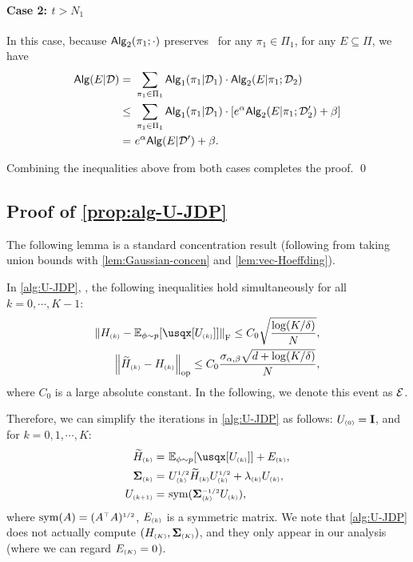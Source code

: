 \paragraph{Case 2: $t>N_1$}
In this case, because $\mathsf{Alg}_2(\pi_1;\cdot)$ preserves \aJDP~for any $\pi_1\in\Pi_1$, for any $E\subseteq \Pi$, we have
\begin{align*}
    \mathsf{Alg}(E|\mathcal{D})=&~\sum_{\pi_1\in\Pi_1} \mathsf{Alg}_1(\pi_1|\mathcal{D}_1) \cdot \mathsf{Alg}_2(E|\pi_1;\mathcal{D}_2) \\
    \leq&~\sum_{\pi_1\in\Pi_1} \mathsf{Alg}_1(\pi_1|\mathcal{D}_1) \cdot {\left[  e^{\alpha}\mathsf{Alg}_2(E|\pi_1;\mathcal{D}_2')+\beta  \right]}\\
    =&~ e^{\alpha} \mathsf{Alg}(E|\mathcal{D}')+\beta.
\end{align*}

Combining the inequalities above from both cases completes the proof.
\qed




\subsection{Proof of \cref{prop:alg-U-JDP}}\label{appdx:proof-U-JDP}


The following lemma is a standard concentration result (following from taking union bounds with \cref{lem:Gaussian-concen} and \cref{lem:vec-Hoeffding}). 

\begin{lemma}\label{lem:spectral-concen-JDP}
In \cref{alg:U-JDP}, 
\whp, the following inequalities hold simultaneously for all $k=0,\cdots,K-1$:
\begin{align}
    \nrmF{H\kk-\Ep{\usqx[U\kk]}}\leq C_0\sqrt\frac{\log(K/\delta)}{N}, \\
    \nrmop{\til H\kk- H\kk}\leq C_0\frac{\siga \sqrt{d+\log(K/\delta)}}{N}, 
\end{align}
where $C_0$ is a large absolute constant. In the following, we denote this event as $\mathcal{E}$.
\end{lemma}


Therefore, we can simplify the iterations in \cref{alg:U-JDP} as follows: $U_{\scriptscriptstyle{ (0) }}=\mathbf{I}$, and for $k=0,1,\cdots,K$:
\begin{align}
    \til H\kk=&~\Ep{ \usqx[U\kk] }+E\kk, \label{eq:spec-update-H}\\
    \cov\kk=&~U\kk\sq \til H\kk U\kk\sq+\lambda\kk U\kk, \label{eq:spec-update-cov}\\
    U\kp=&~\sym(\cov\kk\isq U\kk), \label{eq:spec-update-U}
\end{align}
where $\mathrm{sym}(A)=(A^{{\scriptscriptstyle\top}} A)^{{\scriptscriptstyle1/2}}$, $E_{\scriptscriptstyle{ (k) }}$ is a symmetric matrix.
We note that \cref{alg:U-JDP} does not actually compute $(H_{\scriptscriptstyle{ (K) }}, \boldsymbol{\Sigma}_{\scriptscriptstyle{ (K) }})$, and they only appear in our analysis (where we can regard $E_{\scriptscriptstyle{ (K) }}=0$).

